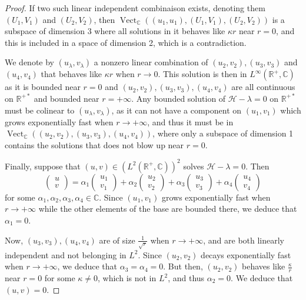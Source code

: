 \documentclass[11 pt]{amsart}
\newcommand{\tmop}[1]{\ensuremath{\operatorname{#1}}}
\theoremstyle{definition}
\theoremstyle{remark}
\numberwithin{equation}{section}
\begin{document}
\begin{proof}
  If two such linear independent combinaison exists, denoting them $(U_1,
  V_1)$ and $(U_2, V_2)$, then $\tmop{Vect}_{\mathbb{C}} ((u_1, u_1), (U_1,
  V_1), (U_2, V_2))$ is a subspace of dimension $3$ where all solutions in it
  behaves like $\kappa r$ near $r = 0$, and this is included in a space of
  dimension 2, which is a contradiction.
  
  We denote by $(u_{\lambda}, v_{\lambda})$ a nonzero linear combination of
  $(u_2, v_2), (u_3, v_3)$ and $(u_4, v_4)$ that behaves like $\kappa r$ when
  $r \rightarrow 0$. This solution is then in $L^{\infty} (\mathbb{R}^+,
  \mathbb{C})$ as it is bounded near $r = 0$ and $(u_2, v_2), (u_3, v_3),
  (u_4, v_4)$ are all continuous on $\mathbb{R}^{+ \ast}$ and bounded near $r
  = + \infty$. Any bounded solution of $\mathcal{H}- \lambda = 0$ on
  $\mathbb{R}^{+ \ast}$ must be colinear to $(u_{\lambda}, v_{\lambda})$, as
  it can not have a component on $(u_1, v_1)$ which grows exponentially fast
  when $r \rightarrow + \infty$, and thus it must be in
  $\tmop{Vect}_{\mathbb{C}} ((u_2, v_2), (u_3, v_3), (u_4, v_4))$, where only
  a subspace of dimension 1 contains the solutions that does not blow up near
  $r = 0$.
  
  Finally, suppose that $(u, v) \in (L^2 (\mathbb{R}^+, \mathbb{C}))^2$ solves
  $\mathcal{H}- \lambda = 0$. Then
  \[ \left(\begin{array}{c}
       u\\
       v
     \end{array}\right) = \alpha_1 \left(\begin{array}{c}
       u_1\\
       v_1
     \end{array}\right) + \alpha_2 \left(\begin{array}{c}
       u_2\\
       v_2
     \end{array}\right) + \alpha_3 \left(\begin{array}{c}
       u_3\\
       v_3
     \end{array}\right) + \alpha_4 \left(\begin{array}{c}
       u_4\\
       v_4
     \end{array}\right) \]
  for some $\alpha_1, \alpha_2, \alpha_3, \alpha_4 \in \mathbb{C}$. Since
  $(u_1, v_1)$ grows exponentially fast when $r \rightarrow + \infty$ while
  the other elements of the base are bounded there, we deduce that $\alpha_1 =
  0$.
  
  Now, $(u_3, v_3), (u_4, v_4)$ are of size $\frac{1}{\sqrt{r}}$ when $r
  \rightarrow + \infty$, and are both linearly independent and not belonging
  in $L^2$. Since $(u_2, v_2)$ decays exponentially fast when $r \rightarrow +
  \infty$, we deduce that $\alpha_3 = \alpha_4 = 0$. But then, $(u_2, v_2)$
  behaves like $\frac{\kappa}{r}$ near $r = 0$ for some $\kappa \neq 0$, which
  is not in $L^2$, and thus $\alpha_2 = 0$. We deduce that $(u, v) = 0$.
\end{proof}
\end{document}
